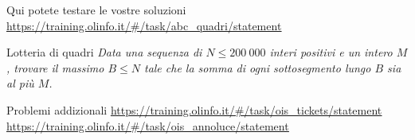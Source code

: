 \documentclass{beamer}
\begin{document}
\begin{frame}{Qui potete testare le vostre soluzioni}
    \small{\underline{\url{https://training.olinfo.it/\#/task/abc_quadri/statement}}}
    \begin{exampleblock}{Lotteria di quadri}
    \textit{Data una sequenza di $N \leq 200 \ 000$ interi positivi e un intero $M$, trovare il massimo $B \leq N$ tale che la somma di ogni sottosegmento lungo $B$ sia al pi\`u $M$.}
    \end{exampleblock}
\end{frame}

\begin{frame}{Problemi addizionali}
    \underline{\url{https://training.olinfo.it/\#/task/ois_tickets/statement}}
    \underline{\url{https://training.olinfo.it/\#/task/ois_annoluce/statement}}
\end{frame}
\end{document}
